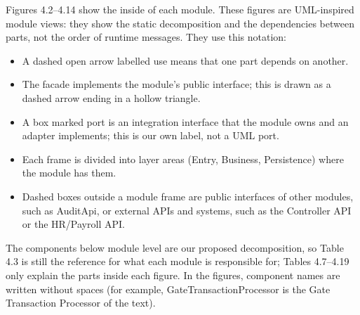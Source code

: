 {}


Figures 4.2--4.14 show the inside of each module. These figures are UML-inspired module views: they show the static decomposition and the dependencies between parts, not the order of runtime messages. They use this notation:

\begin{itemize}[leftmargin=36pt, itemsep=2pt, topsep=4pt, parsep=2pt]
  \item A dashed open arrow labelled \guillemotleft use\guillemotright{} means that one part depends on another.
  \item The facade implements the module's public interface; this is drawn as a dashed arrow ending in a hollow triangle.
  \item A box marked \guillemotleft port\guillemotright{} is an integration interface that the module owns and an adapter implements; this is our own label, not a UML port.
  \item Each frame is divided into \guillemotleft layer\guillemotright{} areas (Entry, Business, Persistence) where the module has them.
  \item Dashed boxes outside a module frame are public interfaces of other modules, such as AuditApi, or external APIs and systems, such as the Controller API or the HR/Payroll API.
\end{itemize}

The components below module level are our proposed decomposition, so Table 4.3 is still the reference for what each module is responsible for; Tables 4.7--4.19 only explain the parts inside each figure. In the figures, component names are written without spaces (for example, GateTransactionProcessor is the Gate Transaction Processor of the text).

